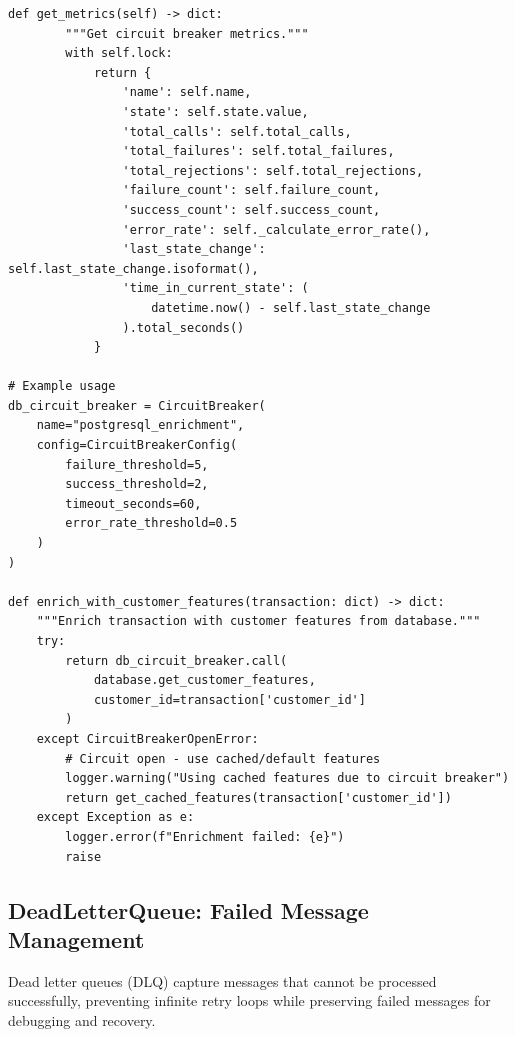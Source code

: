 \begin{lstlisting}[style=python, caption={Circuit Breaker Pattern}]
    def get_metrics(self) -> dict:
        """Get circuit breaker metrics."""
        with self.lock:
            return {
                'name': self.name,
                'state': self.state.value,
                'total_calls': self.total_calls,
                'total_failures': self.total_failures,
                'total_rejections': self.total_rejections,
                'failure_count': self.failure_count,
                'success_count': self.success_count,
                'error_rate': self._calculate_error_rate(),
                'last_state_change': self.last_state_change.isoformat(),
                'time_in_current_state': (
                    datetime.now() - self.last_state_change
                ).total_seconds()
            }

# Example usage
db_circuit_breaker = CircuitBreaker(
    name="postgresql_enrichment",
    config=CircuitBreakerConfig(
        failure_threshold=5,
        success_threshold=2,
        timeout_seconds=60,
        error_rate_threshold=0.5
    )
)

def enrich_with_customer_features(transaction: dict) -> dict:
    """Enrich transaction with customer features from database."""
    try:
        return db_circuit_breaker.call(
            database.get_customer_features,
            customer_id=transaction['customer_id']
        )
    except CircuitBreakerOpenError:
        # Circuit open - use cached/default features
        logger.warning("Using cached features due to circuit breaker")
        return get_cached_features(transaction['customer_id'])
    except Exception as e:
        logger.error(f"Enrichment failed: {e}")
        raise
\end{lstlisting}

\subsection{DeadLetterQueue: Failed Message Management}

Dead letter queues (DLQ) capture messages that cannot be processed successfully, preventing infinite retry loops while preserving failed messages for debugging and recovery.

